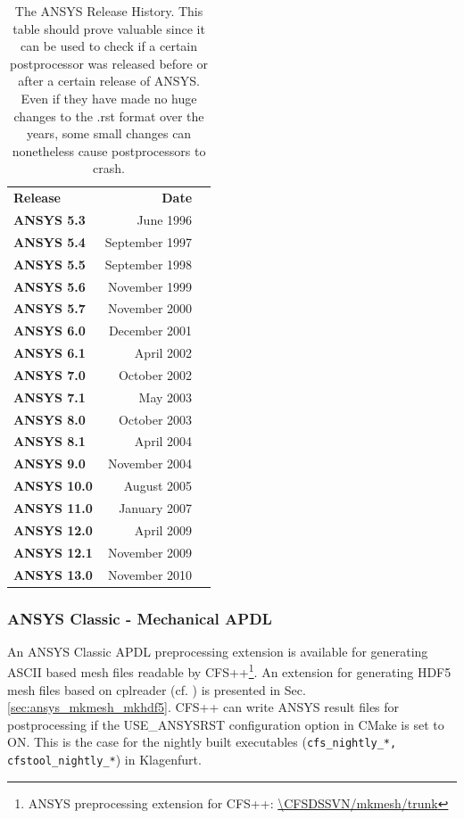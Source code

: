 \begin{table}[htb]
\centering
\begin{minipage}{18cc}\caption{The ANSYS  Release History.  This  table should
prove valuable  since it can be used  to check if a  certain postprocessor was
released before or after a certain release of ANSYS. Even if they have made no
huge  changes to  the  .rst format  over  the years,  some  small changes  can
nonetheless cause postprocessors to crash.}
\label{tab:ansys_releases}
\end{minipage}
\par\medskip\noindent
\begin{minipage}{18cc}
\centering
\begin{tabular}{lrl}
  \toprule
  {\bf Release}    & {\bf Date}     \\ \otoprule
  {\bf ANSYS 5.3}  & June 1996      \\
  {\bf ANSYS 5.4}  & September 1997 \\
  {\bf ANSYS 5.5}  & September 1998 \\
  {\bf ANSYS 5.6}  & November 1999  \\
  {\bf ANSYS 5.7}  & November 2000  \\
  {\bf ANSYS 6.0}  & December 2001  \\
  {\bf ANSYS 6.1}  & April 2002     \\
  {\bf ANSYS 7.0}  & October 2002   \\
  {\bf ANSYS 7.1}  & May 2003       \\
  {\bf ANSYS 8.0}  & October 2003   \\
  {\bf ANSYS 8.1}  & April 2004     \\
  {\bf ANSYS 9.0}  & November 2004  \\
  {\bf ANSYS 10.0} & August 2005    \\
  {\bf ANSYS 11.0} & January 2007   \\
  {\bf ANSYS 12.0} & April 2009     \\
  {\bf ANSYS 12.1} & November 2009  \\
  {\bf ANSYS 13.0} & November 2010  \\
  \bottomrule
\end{tabular} 
\end{minipage}
\end{table}
\newpage

\subsubsection{ANSYS Classic - Mechanical APDL}
\label{sec:intro_ansys_classic} An ANSYS  Classic APDL preprocessing extension
is   available   for  generating   ASCII   based   mesh  files   readable   by
CFS++\footnote{ANSYS       preprocessing       extension      for       CFS++:
  \url{\CFSDSSVN/mkmesh/trunk}}.  An extension for  generating HDF5 mesh files
based  on  cplreader  (cf.    \cite{cplreadermanual})  is  presented  in  Sec.
\ref{sec:ansys_mkmesh_mkhdf5}.   CFS++  can  write   ANSYS  result  files  for
postprocessing if  the USE\_ANSYSRST configuration  option in CMake is  set to
ON. This is the case for  the nightly built executables ({\tt cfs\_nightly\_*,
  cfstool\_nightly\_*}) in Klagenfurt.

